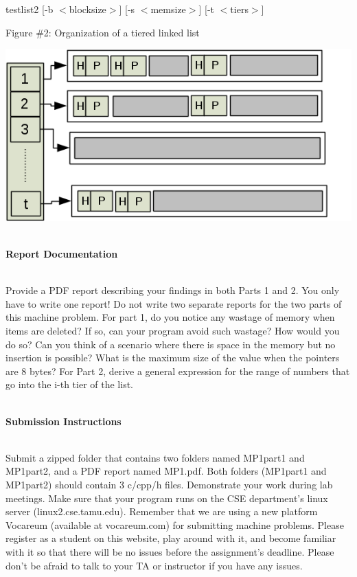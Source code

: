 \documentclass[12pt]{extarticle}
\newenvironment{myindentpar}[1]%
 {\begin{list}{}%
         {\setlength{\leftmargin}{#1}}%
         \item[]%
 }
 {\end{list}}
\begin{document}
\begin{myindentpar}{6.5mm}
\begin{itemize}
        \begin{center}
            testlist2 [-b $<$blocksize$>$] [-s $<$memsize$>$] [-t $<$tiers$>$]
        \end{center}
        \begin{center}
            Figure \#2: Organization of a tiered linked list
        \end{center}
        \begin{center}
            \includegraphics[scale=0.95]{tll_organization.png}
        \end{center}
        
    \end{itemize}
    
    \ \\
    \textbf{Report Documentation}
    \vspace{-3mm}
    
    \ \\
    Provide a PDF report describing your findings in both Parts 1 and 2.  You only have to write one report!  Do not write two separate reports for the two parts of this machine problem.  For part 1, do you notice any wastage of memory when items are deleted?  If so, can your program avoid such wastage?  How would you do so?  Can you think of a scenario where there is space in the memory but no insertion is possible?  What is the maximum size of the value when the pointers are 8 bytes?  For Part 2, derive a general expression for the range of numbers that go into the i-th tier of the list.  
    
    \ \\
    \textbf{Submission Instructions}
    
    \vspace{-3mm}
    \ \\
    Submit a zipped folder that contains two folders named MP1part1 and MP1part2, and a PDF report named MP1.pdf.  Both folders (MP1part1 and MP1part2) should contain 3 c/cpp/h files.  Demonstrate your work during lab meetings.  Make sure that your program runs on the CSE department's linux server (linux2.cse.tamu.edu).  Remember that we are using a new platform Vocareum (available at vocareum.com) for submitting machine problems.  Please register as a student on this website, play around with it, and become familiar with it so that there will be no issues before the assignment's deadline.  Please don't be afraid to talk to your TA or instructor if you have any issues.  
    

\end{myindentpar}
\end{document}
